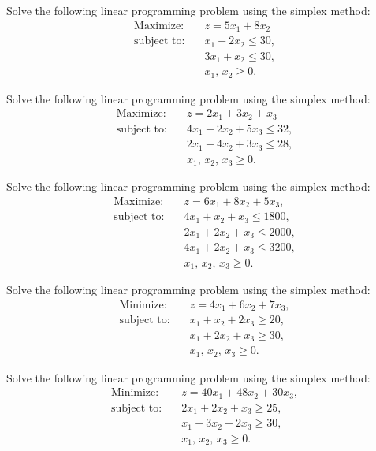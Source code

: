 \begin{ex}{}
Solve the following linear programming problem using the simplex method:
\[
\begin{aligned}
\text{Maximize:}\quad & z = 5x_{1} + 8x_{2}\\
\text{subject to:}\quad & x_{1} + 2x_{2} \le 30,\\
& 3x_{1} + x_{2} \le 30,\\
& x_{1},\, x_{2} \ge 0.
\end{aligned}
\]
\end{ex}

\begin{ex}{}
Solve the following linear programming problem using the simplex method:
\[
\begin{aligned}
\text{Maximize:}\quad & z = 2x_{1} + 3x_{2} + x_{3} \\
\text{subject to:}\quad & 4x_{1} + 2x_{2} + 5x_{3} \le 32,\\
& 2x_{1} + 4x_{2} + 3x_{3} \le 28,\\
& x_{1},\, x_{2},\, x_{3} \ge 0.
\end{aligned}
\]
\end{ex}

\begin{ex}{}
Solve the following linear programming problem using the simplex method:
\[
\begin{aligned}
\text{Maximize:}\quad & z = 6x_{1} + 8x_{2} + 5x_{3},\\
\text{subject to:}\quad & 4x_{1} + x_{2} + x_{3} \le 1800,\\
& 2x_{1} + 2x_{2} + x_{3} \le 2000,\\
& 4x_{1} + 2x_{2} + x_{3} \le 3200,\\
& x_{1},\, x_{2},\, x_{3} \ge 0.
\end{aligned}
\]
\end{ex}

\begin{ex}{}
Solve the following linear programming problem using the simplex method:
\[
\begin{aligned}
\text{Minimize:}\quad & z = 4x_{1} + 6x_{2} + 7x_{3}, \\
\text{subject to:}\quad & x_{1} + x_{2} + 2x_{3} \ge 20,\\
& x_{1} + 2x_{2} + x_{3} \ge 30,\\
& x_{1},\, x_{2},\, x_{3} \ge 0.
\end{aligned}
\]
\end{ex}

\begin{ex}{}
Solve the following linear programming problem using the simplex method:
\[
\begin{aligned}
\text{Minimize:}\quad & z = 40x_{1} + 48x_{2} + 30x_{3}, \\
\text{subject to:}\quad & 2x_{1} + 2x_{2} + x_{3} \ge 25,\\
& x_{1} + 3x_{2} + 2x_{3} \ge 30,\\
& x_{1},\, x_{2},\, x_{3} \ge 0.
\end{aligned}
\]
\end{ex}

